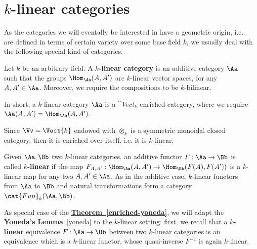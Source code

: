 
\section{\texorpdfstring{$k$}{k}-linear categories}


As the categories we will eventally be interested in
have a geometric origin, i.e. are defined in terms
of certain variety over some base field $k$,
we usually deal with the following special kind of categories.

\begin{df}
    Let $k$ be an arbitrary field. 
    A \textbf{$k$-linear category} is an additive category
    $\Aa$ such that the groups $\Hom_{\Aa}(A,A')$
    are $k$-linear vector spaces, for any $A,A' \in \Aa$.
    Moreover, we require the compositions to be $k$-bilinear.
\end{df}

In short, a $k$-linear category $\Aa$ is a $\cat{Vect}_{k}$-enriched category,
where we require $\Aa(A,A') = \Hom_{\Aa}(A,A')$.

\begin{ex}
    Since $\Vv = \Vect{k}$ endowed with $\otimes_{k}$
    is a symmetric monoidal closed category,
    then it is enriched over itself,
    i.e. it is $k$-linear.
\end{ex}

\begin{df}
    Given $\Aa,\Bb$ two $k$-linear categories,
    an additive functor $F : \Aa \to \Bb$ 
    is called \textbf{$k$-linear}
    if the map $F_{A,A'} : \Hom_{\Aa}(A,A') \to \Hom_{\Bb}(F(A),F(A'))$ 
    is a $k$-linear map for any two
    $A,A' \in \Aa$. As in the additive case, 
    $k$-linear functors from $\Aa$ to $\Bb$ 
    and natural transformations
    form a category $\cat{Fun}_{k}(\Aa, \Bb)$.
\end{df}


As special case of the 
\hyperref[enriched-yoneda]{\textbf{Theorem~\ref*{enriched-yoneda}}},
we will adapt the \hyperref[yoneda]{\textbf{Yoneda's Lemma}~\ref*{yoneda}} 
to the $k$-linear setting:
first, we recall that a \textbf{$k$-linear} equivalence
$F : \Aa \to \Bb$ between two $k$-linear categories
is an equivalence which is a $k$-linear functor,
whose quasi-inverse $F^{-1}$ is again $k$-linear.


